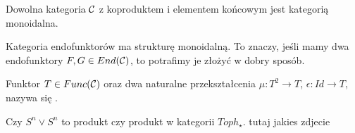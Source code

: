 \begin{example}[m]
\item Dowolna kategoria $\mathcal{C}$ z koproduktem i elementem końcowym jest kategorią monoidalna.
\item Kategoria endofunktorów ma strukturę monoidalną. To znaczy, jeśli mamy dwa endofunktory $F, G\in End(\mathcal{C})$, to potrafimy je złożyć w dobry sposób.

  Funktor $T\in Func(\mathcal{C})$ oraz dwa naturalne przekształcenia $\mu:T^2\to T$, $\epsilon: Id\to T$, nazywa się .
\end{example}

Czy $S^n\vee S^n$ to produkt czy produkt w kategorii $Toph_\star$. tutaj jakies zdjecie






